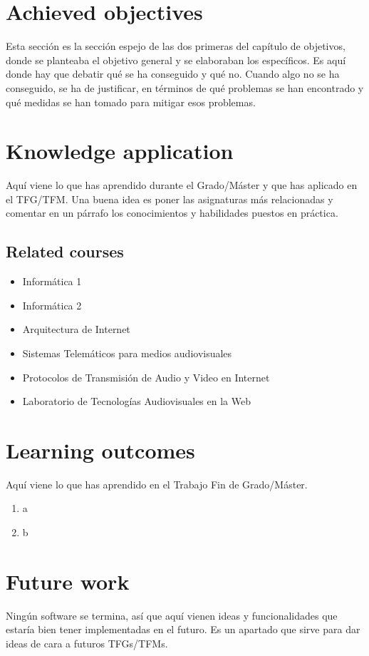 \documentclass[a4paper, 12pt]{book}
\begin{document}
\section{Achieved objectives}
\label{sec:achieved-objectives}
Esta sección es la sección espejo de las dos primeras del capítulo de objetivos,
donde se planteaba el objetivo general y se elaboraban los específicos.
Es aquí donde hay que debatir qué se ha conseguido y qué no. Cuando algo no
se ha conseguido, se ha de justificar, en términos de qué problemas se han
encontrado y qué medidas se han tomado para mitigar esos problemas.
\section{Knowledge application}
\label{sec:knowledge-application}
Aquí viene lo que has aprendido durante el Grado/Máster y que has aplicado
en el TFG/TFM. Una buena idea es poner las asignaturas más relacionadas y
comentar en un párrafo los conocimientos y habilidades puestos en práctica.
\subsection{Related courses}
\begin{itemize}
  \item Informática 1
  \item Informática 2
  \item Arquitectura de Internet
  \item Sistemas Telemáticos para medios audiovisuales
  \item Protocolos de Transmisión de Audio y Video en Internet
  \item Laboratorio de Tecnologías Audiovisuales en la Web
\end{itemize}
\section{Learning outcomes}
\label{sec:learning-outcomes}
Aquí viene lo que has aprendido en el Trabajo Fin de Grado/Máster.
\begin{enumerate}
  \item a
  \item b
\end{enumerate}
\section{Future work}
\label{sec:future-work}
Ningún software se termina, así que aquí vienen ideas y funcionalidades
que estaría bien tener implementadas en el futuro.
Es un apartado que sirve para dar ideas de cara a futuros TFGs/TFMs.
\end{document}
